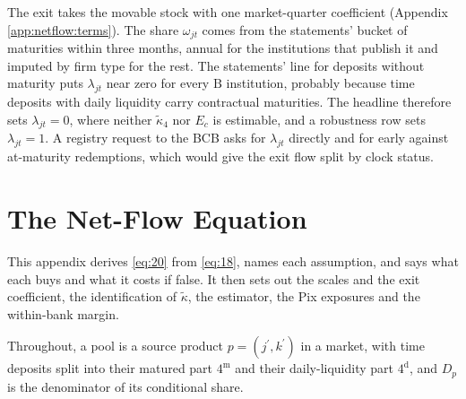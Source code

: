 The exit takes the movable stock with one market-quarter coefficient (Appendix \ref{app:netflow:terms}). The share $\omega_{jt}$ comes from the statements' bucket of maturities within three months, annual for the institutions that publish it and imputed by firm type for the rest. The statements' line for deposits without maturity puts $\lambda_{jt}$ near zero for every $\mathrm{B}$ institution, probably because time deposits with daily liquidity carry contractual maturities. The headline therefore sets $\lambda_{jt}=0$, where neither $\tilde{\kappa}_4$ nor $E_c$ is estimable, and a robustness row sets $\lambda_{jt}=1$. A registry request to the BCB asks for $\lambda_{jt}$ directly and for early against at-maturity redemptions, which would give the exit flow split by clock status.

\section{The Net-Flow Equation}\label{app:netflow}

This appendix derives \eqref{eq:20} from \eqref{eq:18}, names each assumption, and says what each buys and what it costs if false. It then sets out the scales and the exit coefficient, the identification of $\tilde{\kappa}$, the estimator, the Pix exposures and the within-bank margin.

Throughout, a pool is a source product $p=(j^\prime,k^\prime)$ in a market, with time deposits split into their matured part $4^{\mathrm{m}}$ and their daily-liquidity part $4^{\mathrm{d}}$, and $D_p$ is the denominator of its conditional share.


